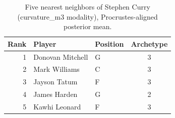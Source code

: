 \begin{table}[htbp]
  \centering\small
  \begin{tabular}{rllc}
    \toprule
    Rank & Player & Position & Archetype \\
    \midrule
    1 & Donovan Mitchell & G & 3 \\
    2 & Mark Williams & C & 3 \\
    3 & Jayson Tatum & F & 3 \\
    4 & James Harden & G & 2 \\
    5 & Kawhi Leonard & F & 3 \\
    \bottomrule
  \end{tabular}
  \caption{Five nearest neighbors of Stephen Curry (curvature_m3 modality), Procrustes-aligned posterior mean.}
  \label{tab:Stephen_Curry_neighbors_curvature_m3}
\end{table}

